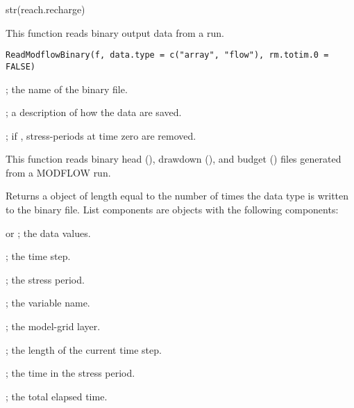 \documentclass[a4paper]{book}
\begin{document}
%
\begin{Examples}
\begin{ExampleCode}
str(reach.recharge)
\end{ExampleCode}
\end{Examples}
%
\begin{Description}\relax
This function reads binary output data from a  run.
\end{Description}
%
\begin{Usage}
\begin{verbatim}
ReadModflowBinary(f, data.type = c("array", "flow"), rm.totim.0 = FALSE)
\end{verbatim}
\end{Usage}
%
\begin{Arguments}
\begin{ldescription}
\item[\code{f}] ; the name of the binary file.
\item[\code{data.type}] ; a description of how the data are saved.
\item[\code{rm.totim.0}] ; if , stress-periods at time zero are removed.
\end{ldescription}
\end{Arguments}
%
\begin{Details}\relax
This function reads binary head (), drawdown (), and budget () files generated from a MODFLOW run.
\end{Details}
%
\begin{Value}
Returns a  object of length equal to the number of times the data type is written to the binary file.
List components are  objects with the following components:
\begin{ldescription}
\item[\code{d}]  or ; the data values.
\item[\code{kstp}] ; the time step.
\item[\code{kper}] ; the stress period.
\item[\code{desc}] ; the variable name.
\item[\code{ilay}] ; the model-grid layer.
\item[\code{delt}] ; the length of the current time step.
\item[\code{pertim}] ; the time in the stress period.
\item[\code{totim}] ; the total elapsed time.
\end{ldescription}
\end{Value}
\end{document}
